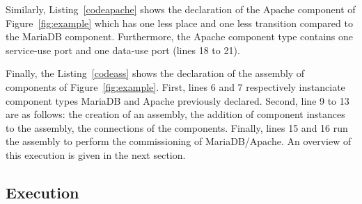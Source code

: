 Similarly, Listing~\ref{codeapache} shows the declaration of the
Apache component of Figure~\ref{fig:example} which has one less place
and one less transition compared to the MariaDB component. Furthermore, the Apache
component type contains one service-use port and one data-use port
(lines 18 to 21).



Finally, the Listing~\ref{codeass} shows the declaration of the
assembly of components of Figure~\ref{fig:example}. First, lines 6 and
7 respectively instanciate component types MariaDB and Apache
previously declared. Second, line 9 to 13 are as follows: the creation
of an assembly, the addition of component instances to the assembly,
the connections of the components. Finally, lines 15 and 16 run the
assembly to perform the commissioning of MariaDB/Apache. An overview
of this execution is given in the next section.



\subsection{Execution}


